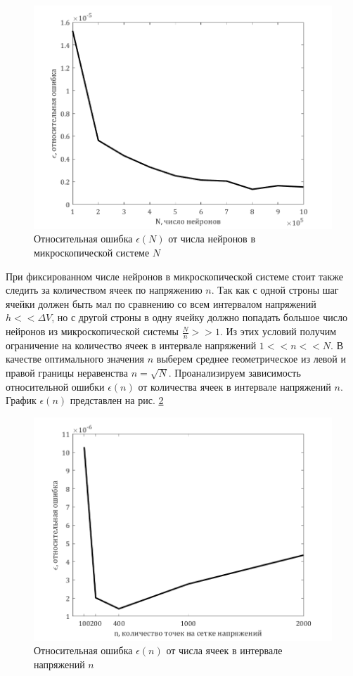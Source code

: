 \begin{figure}[H]
	\centering
	\includegraphics[width=\linewidth]{pic/epsilonN(N).png}
	\caption{Относительная ошибка $\epsilon(N)$ от числа нейронов в микроскопической системе $N$}
	\label{pic:4}
\end{figure}

При фиксированном числе нейронов в микроскопической системе стоит также следить за количеством ячеек по напряжению $n$. Так как с одной строны шаг ячейки должен быть мал по сравнению со всем интервалом напряжений $h<<\Delta V$, но с другой строны в одну ячейку должно попадать большое число нейронов из микроскопической системы $\frac{N}{n}>>1$. Из этих условий получим ограничение на количество ячеек в интервале напряжений $1<<n<<N$. В качестве оптимального значения $n$ выберем среднее геометрическое из левой и правой границы неравенства $n=\sqrt{N}$. Проанализируем зависимость относительной ошибки $\epsilon(n)$ от количества ячеек в интервале напряжений $n$. График $\epsilon(n)$ представлен на рис. \ref{pic:5}
\begin{figure}[H]
	\centering
	\includegraphics[width=\linewidth]{pic/epsilon(n).png}
	\caption{Относительная ошибка $\epsilon(n)$ от числа ячеек в интервале напряжений $n$}
	\label{pic:5}
\end{figure}

